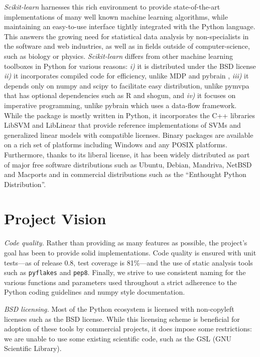 \documentclass[twoside,11pt]{article}
\begin{document}
{\sl Scikit-learn} harnesses this rich environment to provide state-of-the-art
implementations of
many well known machine learning algorithms, while maintaining an
easy-to-use interface tightly integrated with the Python language. This answers the
growing need for statistical data analysis by non-specialists in the software and web
industries, as well as in fields outside of computer-science, such as biology or physics.
\noindent\emph{Scikit-learn} differs from other machine learning toolboxes in Python for
various reasons: \emph{i)} it is distributed under the BSD license
\noindent\emph{ii)} it incorporates compiled code for efficiency, unlike MDP
\citep{zito2008} and pybrain \citep{schaul2010}, \emph{iii)} it depends
only on numpy and scipy to facilitate easy distribution, 
unlike pymvpa \citep{hanke2009} that has optional dependencies such
as R and shogun, and \emph{iv)} it focuses on imperative
programming, unlike pybrain which uses a data-flow framework.
%
While the package is mostly written in Python, it incorporates the C++
libraries LibSVM \citep{chang2001} and LibLinear \citep{fan2008} that
provide reference implementations of SVMs and generalized linear models
with compatible licenses.
%
Binary packages are available on a rich set of platforms including
Windows and any POSIX platforms. Furthermore, thanks to its liberal
license, it has been widely distributed as part
of major free software distributions such as Ubuntu, Debian, Mandriva,
NetBSD and Macports and in commercial distributions such as the ``Enthought
Python Distribution''.


\section{Project Vision}

\noindent\emph{Code quality.}
%
Rather than providing as many features as possible, the project's goal has been to provide solid
implementations. Code quality is ensured with unit
tests---as of release 0.8, test coverage is 81\%---and the use of static
analysis tools such as {\tt pyflakes} and {\tt pep8}. Finally, we
strive to use consistent naming for the various functions and
parameters used throughout a strict adherence to the Python coding
guidelines and numpy style documentation.

\noindent\emph{BSD licensing.}
%
Most of the Python ecosystem is licensed with non-copyleft licenses such
as the BSD license. While this licensing scheme is beneficial for adoption
of these tools by commercial
projects, it does impose some restrictions: we are unable to use some existing
scientific code, such as the GSL (GNU Scientific Library).
\end{document}
